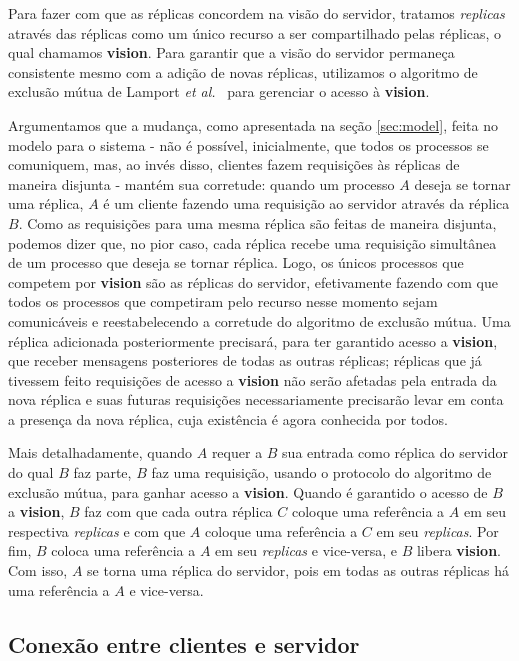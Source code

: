 \documentclass[../main.tex]{subfiles}
\begin{document}
Para fazer com que as réplicas concordem na visão do servidor, tratamos \textit{replicas} através das réplicas como um único recurso a ser compartilhado pelas réplicas, o qual chamamos \textbf{vision}.
Para garantir que a visão do servidor permaneça consistente mesmo com a adição de novas réplicas, utilizamos o algoritmo de exclusão mútua de Lamport \textit{et al.}~\cite{lamport-logical-clocks} para gerenciar o acesso à \textbf{vision}.

Argumentamos que a mudança, como apresentada na seção \ref{sec:model}, feita no modelo para o sistema - não é possível, inicialmente, que todos os processos se comuniquem, mas, ao invés disso, clientes fazem requisições às réplicas de maneira disjunta - mantém sua corretude: quando um processo $A$ deseja se tornar uma réplica, $A$ é um cliente fazendo uma requisição ao servidor através da réplica $B$.
Como as requisições para uma mesma réplica são feitas de maneira disjunta, podemos dizer que, no pior caso, cada réplica recebe uma requisição simultânea de um processo que deseja se tornar réplica.
Logo, os únicos processos que competem por \textbf{vision} são as réplicas do servidor, efetivamente fazendo com que todos os processos que competiram pelo recurso nesse momento sejam comunicáveis e reestabelecendo a corretude do algoritmo de exclusão mútua.
Uma réplica adicionada posteriormente precisará, para ter garantido acesso a \textbf{vision}, que receber mensagens posteriores de todas as outras réplicas; réplicas que já tivessem feito requisições de acesso a \textbf{vision} não serão afetadas pela entrada da nova réplica e suas futuras requisições necessariamente precisarão levar em conta a presença da nova réplica, cuja existência é agora conhecida por todos.

Mais detalhadamente, quando $A$ requer a $B$ sua entrada como réplica do servidor do qual $B$ faz parte, $B$ faz uma requisição, usando o protocolo do algoritmo de exclusão mútua, para ganhar acesso a \textbf{vision}.
Quando é garantido o acesso de $B$ a \textbf{vision}, $B$ faz com que cada outra réplica $C$ coloque uma referência a $A$ em seu respectiva \textit{replicas} e com que $A$ coloque uma referência a $C$ em seu \textit{replicas}.
Por fim, $B$ coloca uma referência a $A$ em seu \textit{replicas} e vice-versa, e $B$ libera \textbf{vision}.
Com isso, $A$ se torna uma réplica do servidor, pois em todas as outras réplicas há uma referência a $A$ e vice-versa.

\subsection{Conexão entre clientes e servidor}
\end{document}
